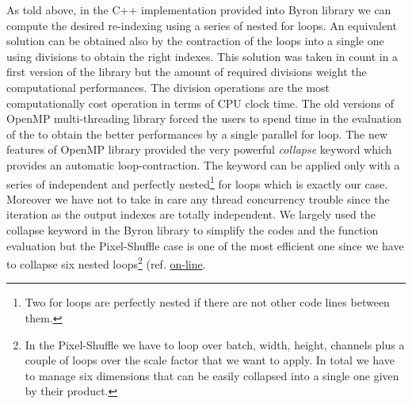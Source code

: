 \documentclass{standalone}
\begin{document}
As told above, in the C++ implementation provided into Byron library we can compute the desired re-indexing using a series of nested for loops.
An equivalent solution can be obtained also by the contraction of the loops into a single one using divisions to obtain the right indexes.
This solution was taken in count in a first version of the library but the amount of required divisions weight the computational performances.
The division operations are the most computationally cost operation in terms of CPU clock time.
The old versions of OpenMP multi-threading library forced the users to spend time in the evaluation of the  to obtain the better performances by a single parallel for loop.
The new features of OpenMP library provided the very powerful \emph{collapse} keyword which provides an automatic loop-contraction.
The keyword can be applied only with a series of independent and perfectly nested\footnote{
  Two for loops are perfectly nested if there are not other code lines between them.
}
for loops which is exactly our case.
Moreover we have not to take in care any thread concurrency trouble since the iteration as the output indexes are totally independent.
We largely used the collapse keyword in the Byron library to simplify the codes and the function evaluation but the Pixel-Shuffle case is one of the most efficient one since we have to collapse six nested loops\footnote{
  In the Pixel-Shuffle we have to loop over batch, width, height, channels plus a couple of loops over the scale factor that we want to apply.
  In total we have to manage six dimensions that can be easily collapsed into a single one given by their product.
} (ref. \href{https://github.com/Nico-Curti/Byron/blob/master/src/shuffler_layer.cpp}{on-line}.
\end{document}
